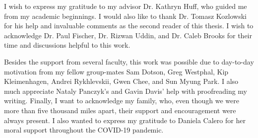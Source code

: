 
I wish to express my gratitude to my advisor Dr. Kathryn Huff, who guided me from my academic beginnings.
I would also like to thank Dr. Tomasz Kozlowski for his help and invaluable comments as the second reader of this thesis.
I wish to acknowledge Dr. Paul Fischer, Dr. Rizwan Uddin, and Dr. Caleb Brooks for their time and discussions helpful to this work.

Besides the support from several faculty, this work was possible due to day-to-day motivation from my fellow group-mates Sam Dotson, Greg Westphal, Kip Kleimenhagen, Andrei Rykhlevskii, Gwen Chee, and Sun Myung Park.
I also much appreciate Nataly Panczyk's and Gavin Davis' help with proofreading my writing.
Finally, I want to acknowledge my family, who, even though we were more than five thousand miles apart, their support and encouragement were always present.
I also wanted to express my gratitude to Daniela Calero for her moral support throughout the COVID-19 pandemic.
